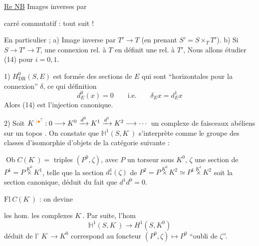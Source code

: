 \uline{Re NB} Images inverses  par


carré commutatif :
tout suit \unsure{\ldots} !

En particulier ;  a) Image inverse par $T'\longrightarrow T$
(en prenant $S'=S\times_T T'$). b) Si $S\longrightarrow T'\longrightarrow T$, une
connexion rel. à $T$ en définit une rel. à $T'$, 
Nous allons étudier (14) pour $i=0,1$.

1) $H^0_{\mathrm{DR}}(S,E)$ est formée des sections  de $E$ qui sont
``horizontales pour la connexion'' $\delta$, ce qui 
définition 
\[
d_E^0(x)=0\qquad\text{i.e.}\qquad\delta_E x=d_E^1x \tag*{(16)}
\]
Alors (14) est l'injection canonique.


2) Soit $K^{\unsure{\cdot|\bullet}}:0\longrightarrow K^0\xrightarrow{d^0}K^1\xrightarrow{d^1}K^2\longrightarrow\cdots$
un complexe  
de faisceaux abéliens sur un topos . On constate que
$\mathbb H^1(S,K^{\cdot})$ s'interprète comme le groupe des
classes d'isomorphie  d'objets de la catégorie suivante  :

$\operatorname{Ob} C(K^{\cdot})=$ triples $(P^0,\zeta)$, avec $P$ un torseur sous $K^0$,
$\zeta$ une section de $P^1=P\mathbin{\overset{K^0}{\times}}K^1$, telle que la section
 $d^1_*(\zeta)$ de $P^2=P\mathbin{\overset{K^0}{\times}}K^2\simeq
P^1\mathbin{\overset{K^1}{\times}}K^2$ soit la section
canonique,  déduit du fait que $d^1d^0=0$.

$\mathrm{Fl}\ C(K^{\cdot})$ : on devine

les hom.  les complexes $K^{\cdot}$. Par suite,
l'hom  
\[
\mathbb H^1(S,K^{\cdot})\longrightarrow H^1(S,K^0)
\]
déduit de l' $K^{\cdot}\longrightarrow K^0$ correspond au
foncteur $(P^0,\zeta)\longmapsto P^0$ ``oubli de $\zeta$''.

